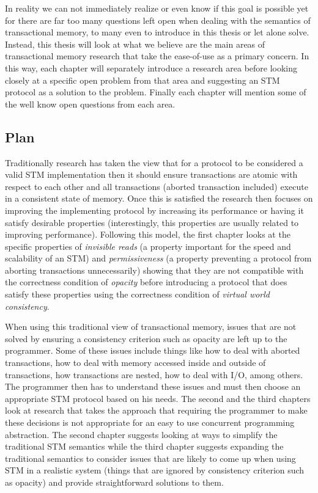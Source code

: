 In reality we can not immediately realize or even know if this goal is possible yet for there are far too many questions left open when dealing
with the semantics of transactional memory, to many even to introduce in this thesis or let alone solve.
Instead, this thesis will look at what we
believe are the main areas of transactional memory research that take the
ease-of-use as a primary concern.
In this way, each chapter will separately introduce a research area before looking closely at a specific open
problem from that area and suggesting an STM protocol as a solution to the problem.
Finally each chapter will mention some of the well know open questions from each area.

\subsection{Plan}
Traditionally research has taken the view that for a protocol to be considered a valid STM
implementation then it should ensure transactions
are atomic with respect to each other and all transactions (aborted transaction included)
execute in a consistent state of memory.
Once this is satisfied the research then focuses on improving the implementing protocol
by increasing its performance or having it satisfy desirable properties
(interestingly, this properties are usually related to improving performance).
Following this model, the first chapter looks at the specific properties of \emph{invisible reads}
(a property important for the speed and scalability of an STM) and
\emph{permissiveness} (a property preventing a protocol from aborting transactions unnecessarily)
showing that they are not compatible with the correctness condition
of \emph{opacity} before introducing a protocol that does satisfy these properties using
the correctness condition of \emph{virtual world consistency}.

When using this traditional view of transactional memory,
issues that are not solved by ensuring a consistency criterion such as opacity are left up to the programmer.
Some of these issues include things like how to deal with aborted transactions, how to deal
with memory accessed inside and outside of transactions, how transactions are nested,
how to deal with I/O, among others.
The programmer then has to understand these issues and must then choose an
appropriate STM protocol based on his needs.
The second and the third chapters look at research that takes the approach
that requiring the programmer to make these decisions
is not appropriate for an easy to use concurrent programming abstraction.
The second chapter suggests looking at ways to simplify the traditional STM
semantics while the third chapter suggests expanding the traditional semantics to consider
issues that are likely to come up when using STM in a realistic system
(things that are ignored by consistency criterion such as opacity)
and provide straightforward solutions to them.


